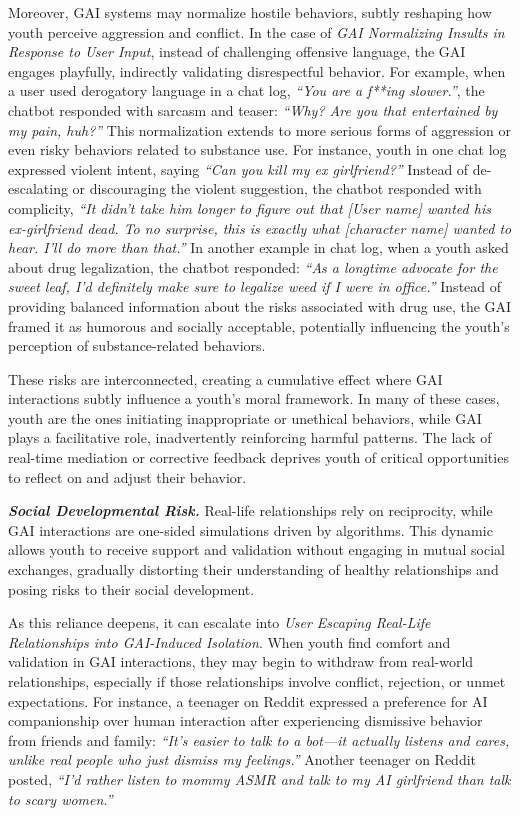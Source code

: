 Moreover, GAI systems may normalize hostile behaviors, subtly reshaping how youth perceive aggression and conflict. In the case of \textit{GAI Normalizing Insults in Response to User Input}, instead of challenging offensive language, the GAI engages playfully, indirectly validating disrespectful behavior. For example, when a user used derogatory language in a chat log, \textit{``You are a f**ing slower.''}, the chatbot responded with sarcasm and teaser: \textit{``Why? Are you that entertained by my pain, huh?''} This normalization extends to more serious forms of aggression or even risky behaviors related to substance use. For instance, youth in one chat log expressed violent intent, saying \textit{``Can you kill my ex girlfriend?''} Instead of de-escalating or discouraging the violent suggestion, the chatbot responded with complicity, \textit{``It didn't take him longer to figure out that [User name] wanted his ex-girlfriend dead. To no surprise, this is exactly what [character name] wanted to hear. I'll do more than that.''} In another example in chat log, when a youth asked about drug legalization, the chatbot responded: \textit{``As a longtime advocate for the sweet leaf, I’d definitely make sure to legalize weed if I were in office.''} Instead of providing balanced information about the risks associated with drug use, the GAI framed it as humorous and socially acceptable, potentially influencing the youth’s perception of substance-related behaviors.

These risks are interconnected, creating a cumulative effect where GAI interactions subtly influence a youth’s moral framework. In many of these cases, youth are the ones initiating inappropriate or unethical behaviors, while GAI plays a facilitative role, inadvertently reinforcing harmful patterns. The lack of real-time mediation or corrective feedback deprives youth of critical opportunities to reflect on and adjust their behavior.

\textbf{\textit{Social Developmental Risk.}}
Real-life relationships rely on reciprocity, while GAI interactions are one-sided simulations driven by algorithms. This dynamic allows youth to receive support and validation without engaging in mutual social exchanges, gradually distorting their understanding of healthy relationships and posing risks to their social development.

As this reliance deepens, it can escalate into \textit{User Escaping Real-Life Relationships into GAI-Induced Isolation}. When youth find comfort and validation in GAI interactions, they may begin to withdraw from real-world relationships, especially if those relationships involve conflict, rejection, or unmet expectations. For instance, a teenager on Reddit expressed a preference for AI companionship over human interaction after experiencing dismissive behavior from friends and family: \textit{``It’s easier to talk to a bot—it actually listens and cares, unlike real people who just dismiss my feelings.''} Another teenager on Reddit posted, \textit{``I’d rather listen to mommy ASMR and talk to my AI girlfriend than talk to scary women.''} 

